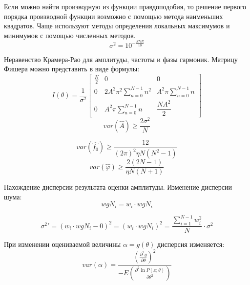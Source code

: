 Если можно найти производную из функции правдоподобия, то решение первого порядка производной функции возможно с помощью метода наименьших квадратов. Чаще используют методы определения локальных максимумов и минимумов с помощью численных методов.
\begin{equation}
	\label{eq:equation1.4.1}
	\sigma^2 = 10^{- \frac{SNR}{10}}
\end{equation}

Неравенство Крамера-Рао для амплитуды, частоты и фазы гармоник.
Матрицу Фишера можно представить в виде формулы:
\begin{equation}
	\label{eq:equation15}
	I(\theta) = \frac{1}{\sigma^2}
	\begin{bmatrix}
		\frac{N}{2} & 0 & 0 \\
		0 & 2A^2 \pi^2 \displaystyle\sum_{n=0}^{N-1} n^2 & A^2 \pi \displaystyle\sum_{n=0}^{N-1} n \\
		0 & A^2 \pi \displaystyle\sum_{n=0}^{N-1} n & \dfrac{NA^2}{2}
	\end{bmatrix}
\end{equation}
\begin{equation}
	\label{eq:equation16}
	var(\hat{A})\geq \frac{2  \sigma^2}{N} 
\end{equation}

\begin{equation}
	\label{eq:equation17}
	var(\hat{f_0})\geq \frac{12}{(2\pi)^2 \eta  N(N^2 - 1)}  
\end{equation}
\begin{equation}
	\label{eq:equation18}
	var(\hat{\varphi})\geq \frac{2(2N-1)}{\eta N(N+1)}  
\end{equation}

Нахождение дисперсии результата оценки амплитуды. Изменение дисперсии шума:
\begin{equation}
	\label{eq:equation19}
	w g N_i = w_i \cdot w g N_i
\end{equation}

\begin{equation}
	\label{eq:equation19}
{\sigma^2}' = (w_i \cdot w g N_i - 0)^2 = (w_i \cdot w g N_i)^2 =\frac{\displaystyle\sum_{i=1}^{N-1} w_i^2}{N} \cdot \sigma^2
\end{equation}

При изменении оцениваемой величины $\alpha=g(\theta)$ дисперсия изменяется:
\begin{equation}
	\label{eq:equation19}
	var (\alpha) = \frac{ \left({\frac{\partial^2 g}{\partial \theta}}\right)^2}{-E \left(\frac{\partial ^2 \ln P(x; \theta)}{\partial \theta^2} \right) }
\end{equation}


